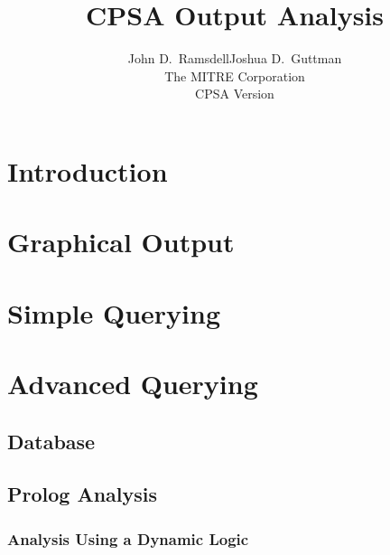 \documentclass[12pt]{article}
\title{CPSA Output Analysis}
\author{John D.~Ramsdell\qquad Joshua D.~Guttman\\
  The MITRE Corporation\\ CPSA Version \version}
\begin{document}
\maketitle
\cpsacopying

\tableofcontents

\nocite{Dijkstra82}

\newpage

\section{Introduction}\label{sec:intro}

\section{Graphical Output}\label{sec:graph}

\section{Simple Querying}\label{sec:simple querying}

\section{Advanced Querying}\label{sec:advanced querying}

\subsection{Database}\label{sec:database}

\subsection{Prolog Analysis}\label{sec:prolog analysis}

\subsubsection{Analysis Using a Dynamic Logic}\label{sec:dynamic logic}



\end{document}
